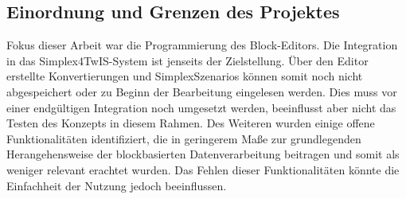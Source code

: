 \subsection{Einordnung und Grenzen des Projektes}
\label{sec:criticism}

Fokus dieser Arbeit war die Programmierung des Block-Editors. Die Integration in das Simplex4TwIS-System ist jenseits der Zielstellung. Über den Editor erstellte Konvertierungen und SimplexSzenarios können somit noch nicht abgespeichert oder zu Beginn der Bearbeitung eingelesen werden. Dies muss vor einer endgültigen Integration noch umgesetzt werden, beeinflusst aber nicht das Testen des Konzepts in diesem Rahmen. Des Weiteren wurden einige offene Funktionalitäten identifiziert, die in geringerem Maße zur grundlegenden Herangehensweise der blockbasierten Datenverarbeitung beitragen und somit als weniger relevant erachtet wurden. Das Fehlen dieser Funktionalitäten könnte die Einfachheit der Nutzung jedoch beeinflussen.
